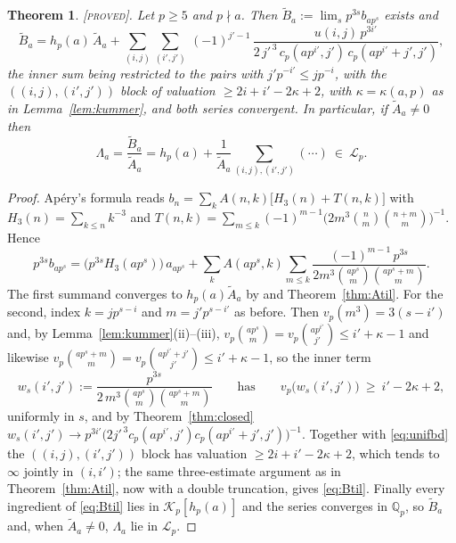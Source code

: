 \documentclass[11pt,reqno]{article}
\newcommand{\Qp}{\mathbb{Q}_p}
\newcommand{\Atil}{\widetilde{A}}
\newcommand{\Btil}{\widetilde{B}}
\newcommand{\vp}{v_p}
\newcommand{\Kalg}{\mathcal{K}_p}
\newcommand{\Lalg}{\mathcal{L}_p}
\newcommand{\bin}[2]{\binom{#1}{#2}}
\newcommand{\PROVED}{{\normalfont\textsc{[proved]}}}
\theoremstyle{plain}
\newtheorem{theorem}{Theorem}[section]
\theoremstyle{definition}
\theoremstyle{remark}
\numberwithin{equation}{section}
\begin{document}
\begin{theorem}\label{thm:Lam}
\PROVED.  Let $p\ge5$ and $p\nmid a$.  Then $\Btil_a:=\lim_sp^{3s}b_{ap^s}$
exists and
\begin{equation}\label{eq:Btil}
  \Btil_a=h_p(a)\,\Atil_a
   +\sum_{(i,j)}\sum_{(i',j')}\ (-1)^{j'-1}\,
     \frac{u(i,j)\,p^{3i'}}{2\,j'^{\,3}\,c_p(ap^{i'},j')\,c_p(ap^{i'}+j',j')},
\end{equation}
the inner sum being restricted to the pairs with $j'p^{-i'}\le jp^{-i}$, with
the $((i,j),(i',j'))$ block of valuation $\ge2i+i'-2\kappa+2$, with
$\kappa=\kappa(a,p)$ as in Lemma~\ref{lem:kummer}, and both series convergent.  In particular, if
$\Atil_a\ne0$ then
\begin{equation}\label{eq:Lamblocks}
  \Lambda_a=\frac{\Btil_a}{\Atil_a}=h_p(a)+\frac{1}{\Atil_a}\sum_{(i,j),(i',j')}(\cdots)
  \ \in\ \Lalg .
\end{equation}
\end{theorem}

\begin{proof}
Ap\'ery's formula \cite{Apery1979,Fischler2003} reads
$b_n=\sum_kA(n,k)\bigl[H_3(n)+T(n,k)\bigr]$ with $H_3(n)=\sum_{k\le n}k^{-3}$
and $T(n,k)=\sum_{m\le k}(-1)^{m-1}\bigl(2m^3\bin nm\bin{n+m}m\bigr)^{-1}$.
Hence
\[
  p^{3s}b_{ap^s}=\bigl(p^{3s}H_3(ap^s)\bigr)\,a_{ap^s}
   +\sum_k A(ap^s,k)\sum_{m\le k}\frac{(-1)^{m-1}\,p^{3s}}
     {2m^3\bin{ap^s}{m}\bin{ap^s+m}{m}} .
\]
The first summand converges to $h_p(a)\Atil_a$ by \cite[Thm.~6.1]{PaperC} and
Theorem~\ref{thm:Atil}.  For the second, index $k=jp^{s-i}$ and $m=j'p^{s-i'}$
as before.  Then $\vp(m^3)=3(s-i')$ and, by Lemma~\ref{lem:kummer}(ii)--(iii),
$\vp\bin{ap^s}{m}=\vp\bin{ap^{i'}}{j'}\le i'+\kappa-1$ and likewise
$\vp\bin{ap^s+m}{m}=\vp\bin{ap^{i'}+j'}{j'}\le i'+\kappa-1$, so the inner term
\[
  w_s(i',j'):=\frac{p^{3s}}{2\,m^3\bin{ap^s}{m}\bin{ap^s+m}{m}}
  \qquad\text{has}\qquad \vp\bigl(w_s(i',j')\bigr)\ \ge\ i'-2\kappa+2,
\]
uniformly in $s$, and by Theorem~\ref{thm:closed}
$w_s(i',j')\to p^{3i'}\bigl(2j'^{\,3}c_p(ap^{i'},j')c_p(ap^{i'}+j',j')\bigr)^{-1}$.
Together with \eqref{eq:unifbd} the $((i,j),(i',j'))$ block has valuation
$\ge2i+i'-2\kappa+2$, which tends to $\infty$ jointly in $(i,i')$; the same
three-estimate argument as in Theorem~\ref{thm:Atil}, now with a double
truncation, gives \eqref{eq:Btil}.  Finally every ingredient of
\eqref{eq:Btil} lies in $\Kalg[h_p(a)]$ and the series converges in $\Qp$, so
$\Btil_a$ and, when $\Atil_a\ne0$, $\Lambda_a$ lie in $\Lalg$.
\end{proof}
\end{document}
